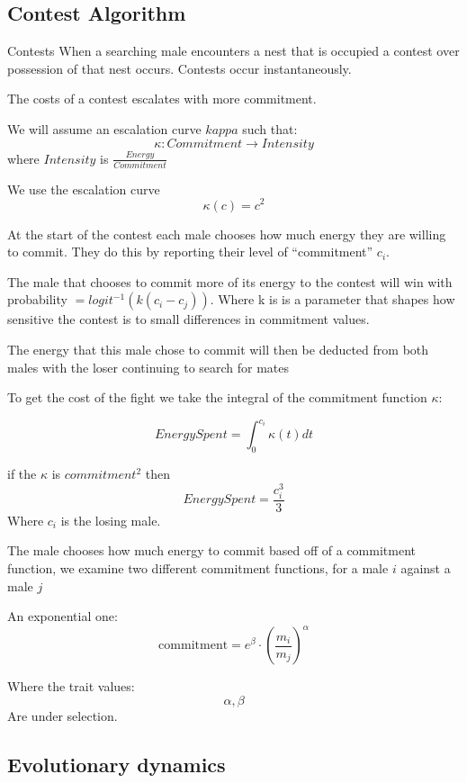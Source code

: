 \documentclass[a4paper,11pt]{article}
\begin{document}
\clearpage

\subsection{Contest Algorithm}
Contests 
When a searching male encounters a nest that is occupied a contest over possession of that nest occurs. Contests occur instantaneously. 

The costs of a contest escalates with more commitment.

We will assume an escalation curve $kappa$ such that:
$$\kappa : Commitment \rightarrow Intensity$$
where $Intensity$ is $\frac{Energy}{Commitment}$

We use the escalation curve $$ \kappa (c) = c^2 $$

At the start of the contest each male chooses how much  energy they are willing to commit.
They do this by reporting their level of ``commitment'' $c_i$.

The male that chooses to commit more of its energy to the contest will win with probability $= logit^{-1}(k(c_i - c_j))$. Where k is is a parameter that shapes how sensitive the contest is to small differences in commitment values. 

The energy that this male chose to commit will then be deducted from both males with the loser continuing to search for mates

To get the cost of the fight we take the integral of the commitment function $\kappa$:

$$Energy Spent = \int_0^{c_i}{\kappa(t)}dt$$

if the $\kappa$ is $commitment^2$ then
$$EnergySpent = \frac{c_i^3}{3}$$
Where $c_i$ is the losing male.


The male chooses how much energy to commit based off of a commitment function, we examine two different commitment functions, for a male $i$ against a male $j$

An exponential one:
$$\mathrm{commitment} = e^\beta \cdot (\frac{m_i}{m_j})^\alpha $$


Where the trait values:
$$\alpha , \beta$$
Are under selection.


\clearpage

\subsection{Evolutionary dynamics}
\end{document}
